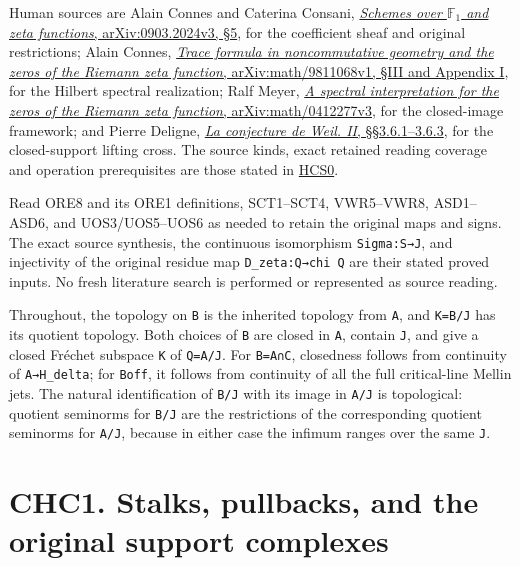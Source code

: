 Human sources are Alain Connes and Caterina Consani,
\href{https://arxiv.org/abs/0903.2024v3}{\emph{Schemes over
\(\mathbb F_1\) and zeta functions}, arXiv:0903.2024v3, §5}, for the
coefficient sheaf and original restrictions; Alain Connes,
\href{https://arxiv.org/abs/math/9811068v1}{\emph{Trace formula in
noncommutative geometry and the zeros of the Riemann zeta function},
arXiv:math/9811068v1, §III and Appendix I}, for the Hilbert spectral
realization; Ralf Meyer,
\href{https://arxiv.org/abs/math/0412277v3}{\emph{A spectral
interpretation for the zeros of the Riemann zeta function},
arXiv:math/0412277v3}, for the closed-image framework; and Pierre
Deligne,
\href{https://www.numdam.org/item/PMIHES_1980__52__137_0/}{\emph{La
conjecture de Weil. II}, §§3.6.1--3.6.3}, for the closed-support lifting
cross. The source kinds, exact retained reading coverage and operation
prerequisites are those stated in
\href{https://github.com/KokunoYumeto/zeta-function-research-reader/blob/main/workbenches/splitzero-tandem/continuations/20260925-full-source-tensor-and-original-divisor/counterfactual/HILBERT_CLOSURE_CLOSED_SUPPORT_AND_RESTRICTION.md}{HCS0}.

Read ORE8 and its ORE1 definitions, SCT1--SCT4, VWR5--VWR8, ASD1--ASD6,
and UOS3/UOS5--UOS6 as needed to retain the original maps and signs. The
exact source synthesis, the continuous isomorphism \texttt{Sigma:S→J},
and injectivity of the original residue map
\texttt{D\_zeta:Q→chi\ Q\textquotesingle{}} are their stated proved
inputs. No fresh literature search is performed or represented as source
reading.

Throughout, the topology on \texttt{B} is the inherited topology from
\texttt{A}, and \texttt{K=B/J} has its quotient topology. Both choices
of \texttt{B} are closed in \texttt{A}, contain \texttt{J}, and give a
closed Fréchet subspace \texttt{K} of \texttt{Q=A/J}. For
\texttt{B=A∩C}, closedness follows from continuity of
\texttt{A→H\_delta}; for \texttt{Boff}, it follows from continuity of
all the full critical-line Mellin jets. The natural identification of
\texttt{B/J} with its image in \texttt{A/J} is topological: quotient
seminorms for \texttt{B/J} are the restrictions of the corresponding
quotient seminorms for \texttt{A/J}, because in either case the infimum
ranges over the same \texttt{J}.

\section{CHC1. Stalks, pullbacks, and the original support
complexes}\label{chc1.-stalks-pullbacks-and-the-original-support-complexes}

